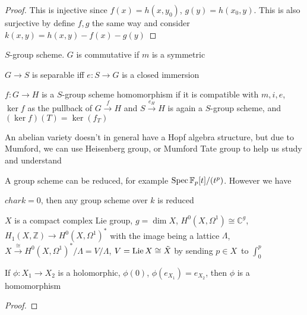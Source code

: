 \begin{proof}
This is injective since $f(x)=h(x,y_0)$, $g(y)=h(x_0,y)$. This is also surjective by define $f,g$ the same way and consider $k(x,y)=h(x,y)-f(x)-g(y)$
\end{proof}

\begin{definition}
$S$-group scheme. $G$ is commutative if $m$ is a symmetric
\end{definition}

\begin{exercise}
$G\to S$ is separable iff $e:S\to G$ is a closed immersion
\end{exercise}

\begin{definition}
$f:G\to H$ is a $S$-group scheme homomorphism if it is compatible with $m,i,e$, $\ker f$ as the pullback of $G\xrightarrow{f} H$ and $S\xrightarrow{e_H}H$ is again a $S$-group scheme, and $(\ker f)(T)=\ker(f_T)$
\end{definition}

An abelian variety doesn't in general have a Hopf algebra structure, but due to Mumford, we can use Heisenberg group, or Mumford Tate group to help us study and understand

A group scheme can be reduced, for example $\operatorname{Spec}\mathbb F_p[t]/(t^p)$. However we have

\begin{theorem}[Oort]
$char k=0$, then any group scheme over $k$ is reduced
\end{theorem}

$X$ is a compact complex Lie group, $g=\dim X$, $H^0(X,\Omega^1)\cong\mathbb C^g$, $H_1(X,\mathbb Z)\to H^0(X,\Omega^1)^*$ with the image being a lattice $\Lambda$, $X\xrightarrow{\cong} H^0(X,\Omega^1)^*/\Lambda=V/\Lambda$, $V=\operatorname{Lie} X\cong\tilde X$ by sending $p\in X$\ to $\int_0^p$

If $\phi:X_1\to X_2$ is a holomorphic, $\phi(0)$, $\phi(e_{X_1})=e_{X_2}$, then $\phi$ is a homomorphism

\begin{proof}
\end{proof}

